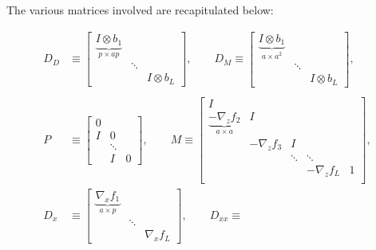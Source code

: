 \documentclass{article}
\begin{document}
The various matrices involved are recapitulated below:

\begin{align*}
  D_D    & \equiv
  \begin{bmatrix}
    \underbrace{I \otimes b_1}_{p \times ap} &        &               \\
    & \ddots &               \\
    &        & I \otimes b_L
  \end{bmatrix}
  ,
  \qquad
  D_M \equiv
  \begin{bmatrix}
    \underbrace{I \otimes b_1}_{a \times a^2} &        &               \\
    & \ddots &               \\
    &        & I \otimes b_L
  \end{bmatrix}
  ,                                                                                                \\                                                                                     \\
  P      & \equiv
  \begin{bmatrix}
    0 \\ I & 0 \\ &\ddots \\ &I&0
  \end{bmatrix}
  ,    \qquad
  M       \equiv
  \begin{bmatrix}
    I                                                                                    \\
    \underbrace{-\nabla_z f_2}_{a \times a} & I                                          \\
    & -\nabla_z f_3 & I                          \\
    &               & \ddots & \ddots            \\
    &               &        & -\nabla_z f_L & 1 \\
  \end{bmatrix}
  ,                                                                                                \\
  D_x    & \equiv
  \begin{bmatrix}
    \underbrace{\nabla_x f_1}_{a\times p} &                       \\
    & \ddots                \\
    &        & \nabla_x f_L
  \end{bmatrix}
  , \qquad
  D_{xx} \equiv

\end{align*}
\end{document}
